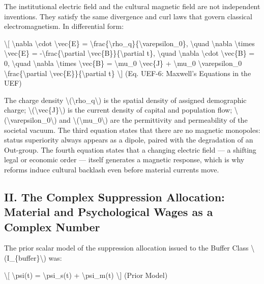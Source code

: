 The institutional electric field and the cultural magnetic field are not independent inventions. They satisfy the same divergence and curl laws that govern classical electromagnetism. In differential form:

\textbackslash{[}
\textbackslash nabla \textbackslash cdot \textbackslash vec\{E\} = \textbackslash frac\{\textbackslash rho_q\}\{\textbackslash varepsilon_0\}, \textbackslash quad
\textbackslash nabla \textbackslash times \textbackslash vec\{E\} = -\textbackslash frac\{\textbackslash partial \textbackslash vec\{B\}\}\{\textbackslash partial t\}, \textbackslash quad
\textbackslash nabla \textbackslash cdot \textbackslash vec\{B\} = 0, \textbackslash quad
\textbackslash nabla \textbackslash times \textbackslash vec\{B\} = \textbackslash mu_0 \textbackslash vec\{J\} + \textbackslash mu_0 \textbackslash varepsilon_0 \textbackslash frac\{\textbackslash partial \textbackslash vec\{E\}\}\{\textbackslash partial t\}
\label{eq:uef-6}
\textbackslash{]} {(Eq. UEF-6: Maxwell's Equations in the UEF)}

The charge density \textbackslash(\textbackslash rho_q\textbackslash) is the spatial density of assigned demographic charge; \textbackslash(\textbackslash vec\{J\}\textbackslash) is the current density of capital and population flow; \textbackslash(\textbackslash varepsilon_0\textbackslash) and \textbackslash(\textbackslash mu_0\textbackslash) are the permittivity and permeability of the societal vacuum. The third equation states that there are no magnetic monopoles: status superiority always appears as a dipole, paired with the degradation of an Out-group. The fourth equation states that a changing electric field --- a shifting legal or economic order --- itself generates a magnetic response, which is why reforms induce cultural backlash even before material currents move.

\protect{}\label{sec-complex-wage}
\subsection{II. The Complex Suppression Allocation: Material and
Psychological Wages as a Complex
Number}\label{ii.-the-complex-suppression-allocation-material-and-psychological-wages-as-a-complex-number}

The prior scalar model of the suppression allocation issued to the
Buffer Class \textbackslash(I\_\{buffer\}\textbackslash) was:

\textbackslash{[} \textbackslash psi(t) = \textbackslash psi\_s(t) +
\textbackslash psi\_m(t) \textbackslash{]} {(Prior Model)}

